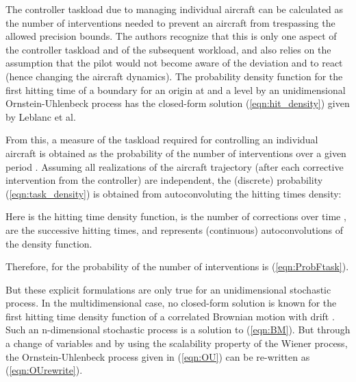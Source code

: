 \documentclass[conference]{IEEEtran}
\begin{document}
The controller taskload due to managing individual aircraft can be calculated as the number of interventions needed to prevent an aircraft from trespassing the allowed precision bounds. The authors recognize that this is only one aspect of the controller taskload and of the subsequent workload, and also relies on the assumption that the pilot would not become aware of the deviation and to react (hence changing the aircraft dynamics). The probability density function for the first hitting time of a boundary  for an origin at  and a level  by an unidimensional Ornstein-Uhlenbeck process has the closed-form solution (\ref{eqn:hit_density}) given by Leblanc et al. \cite{Leb00}



From this, a measure of the taskload required for controlling an individual aircraft is obtained  as the probability of the number of interventions over a given period . Assuming all realizations of the aircraft trajectory (after each corrective intervention from the controller) are independent, the (discrete) probability (\ref{eqn:task_density}) is obtained from autoconvoluting the hitting times density:
 

Here  is the hitting time density function,  is the number of corrections over time ,  are the successive hitting times, and  represents  (continuous) autoconvolutions of the density function. 
 

Therefore, for  the probability of the number of interventions is (\ref{eqn:ProbFtask}).



But these explicit formulations are only true for an unidimensional stochastic process. In the multidimensional case, no closed-form solution is known for the first hitting time density function of a correlated Brownian motion with drift \cite{Met10}.  Such an n-dimensional stochastic process  is a solution to (\ref{eqn:BM}). But through a change of variables and by using the scalability property of the Wiener process, the Ornstein-Uhlenbeck process given in (\ref{eqn:OU}) can be re-written as (\ref{eqn:OUrewrite}).
\end{document}
